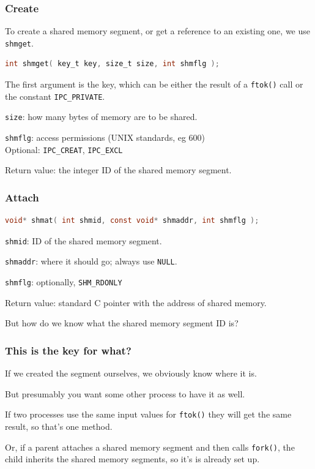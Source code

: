 \begin{frame}[fragile]
	\frametitle{Create}

	To create a shared memory segment, or get a reference to an existing one, we use \texttt{shmget}.

	\begin{lstlisting}[language=C]
int shmget( key_t key, size_t size, int shmflg );
\end{lstlisting}

	The first argument is the key, which can be either the result of a \texttt{ftok()} call or the constant \texttt{IPC\_PRIVATE}.

	\texttt{size}: how many bytes of memory are to be shared.

	\texttt{shmflg}: access permissions (UNIX standards, eg 600)\\
	\quad Optional: \texttt{IPC\_CREAT}, \texttt{IPC\_EXCL}

	Return value: the integer ID of the shared memory segment.
\end{frame}

\begin{frame}[fragile]
	\frametitle{Attach}
	\begin{lstlisting}[language=C]
void* shmat( int shmid, const void* shmaddr, int shmflg );
\end{lstlisting}

	\texttt{shmid}: ID of the shared memory segment.

	\texttt{shmaddr}: where it should go; always use \texttt{NULL}.

	\texttt{shmflg}: optionally, \texttt{SHM\_RDONLY}

	Return value: standard C pointer with the address of shared memory.

	But how do we know what the shared memory segment ID is?

\end{frame}

\begin{frame}
	\frametitle{This is the key for what?}

	If we created the segment ourselves, we obviously know where it is.

	But presumably you want some other process to have it as well.

	If two processes use the same input values for \texttt{ftok()} they will get the same result, so that's one method.

	Or, if a parent attaches a shared memory segment and then calls \texttt{fork()}, the child inherits the shared memory segments, so it's is already set up.

\end{frame}


